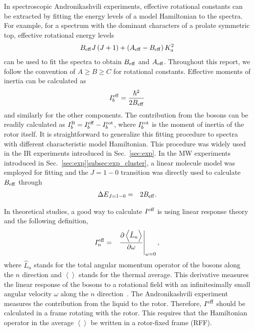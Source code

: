 \documentclass[12pt]{iopart}
\begin{document}
In spectroscopic Andronikashvili experiments, effective rotational constants can be extracted by fitting the energy levels of a model Hamiltonian to the spectra. 
For example, for a spectrum with the dominant characters of a prolate symmetric top, 
effective rotational energy levels
\begin{eqnarray}
B_{\rm eff}J\left(J+1\right)+\left(A_{\rm eff}-B_{\rm eff} \right)K_a^2
\end{eqnarray}
can be used to fit the spectra to obtain $B_{\rm eff}$ and $A_{\rm eff}$. Throughout this report, we follow the convention of $A \ge B \ge C$ for rotational constants. Effective moments of inertia can be calculated as
\begin{eqnarray}
I_b^{\rm eff}=\frac{\hbar^2}{2{B_{\rm eff}}}
\end{eqnarray}
and similarly for the other components. The contribution from the bosons can be readily calculated as $I_b^{\rm B}=I_b^{\rm eff} - I_b^{\rm rot}$, where $I_b^{\rm rot}$ is the moment of inertia of the rotor itself. It is straightforward to generalize this fitting procedure to spectra with different characteristic model Hamiltonian. This procedure was widely used in the IR experiments introduced in Sec.~\ref{sec:exp}. In the MW experiments introduced in Sec.~\ref{sec:exp}\ref{subsec:exp_cluster}, a linear molecule model was employed for fitting and the $J=1-0$ transition was directly used to calculate $B_{\rm eff}$ through
\begin{eqnarray}
\Delta E_{J=1-0}&=&2B_{\rm eff}.
\end{eqnarray}

In theoretical studies, a good way to calculate $I^{\rm eff}$ is using linear response theory and  the following definition,
\begin{eqnarray}
I^{\rm eff}_n&=&\left.\frac{\partial\left< \hat{L}_n \right>}{\partial \omega}\right|_{\omega=0},
\end{eqnarray}
where $\hat{L}_n$ stands for the total angular momentum operator of the bosons along the $n$ direction and $\left< \right>$ stands for the thermal average. 
This derivative measures the linear response of the bosons to a rotational field with an infinitesimally small angular velocity $\omega$ along the $n$ direction~\cite{rotating_bucket_1,rotating_bucket_2,Ieff_stringari}. 
The Andronikashvili experiment measures the contribution from the liquid to the rotor. 
Therefore, $I^{\rm eff}$ should be calculated in a frame rotating with the rotor. 
This requires that the Hamiltonian operator in the average $\left< \right>$  be written 
in a rotor-fixed frame (RFF).
\end{document}
